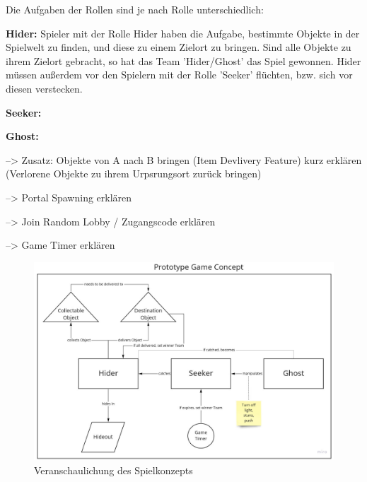 Die Aufgaben der Rollen sind je nach Rolle unterschiedlich:

\textbf{Hider:}
Spieler mit der Rolle Hider haben die Aufgabe, bestimmte Objekte in der Spielwelt zu finden, und diese zu einem Zielort zu bringen. Sind alle Objekte zu ihrem Zielort gebracht, so hat das Team 'Hider/Ghost' das Spiel gewonnen. Hider müssen außerdem vor den Spielern mit der Rolle 'Seeker' flüchten, bzw. sich vor diesen verstecken.

\textbf{Seeker:}

\textbf{Ghost:}



--> Zusatz: Objekte von A nach B bringen (Item Devlivery Feature) kurz erklären (Verlorene Objekte zu ihrem Urpsrungsort zurück bringen)

--> Portal Spawning erklären

--> Join Random Lobby / Zugangscode erklären

--> Game Timer erklären

\begin{figure}
	\centering
	\includegraphics[width=150mm]{images/game_concept.jpg}
	\caption[Spielkonzept Diagramm]{Veranschaulichung des Spielkonzepts}
	\label{pic:game_concept}
\end{figure}


